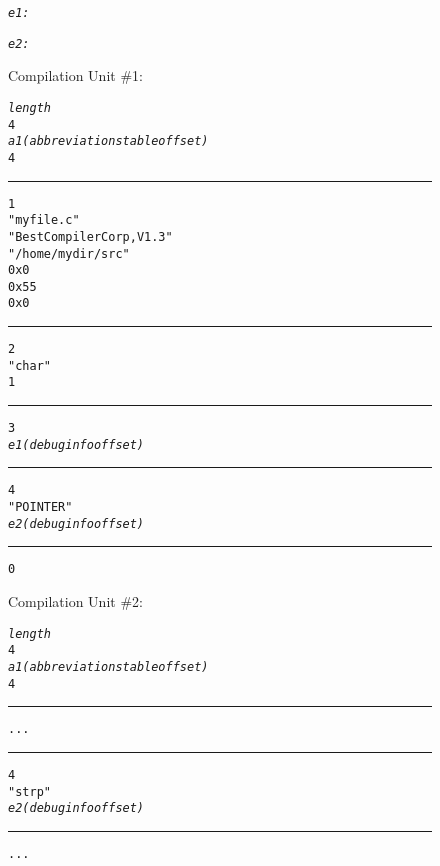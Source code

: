 \clearpage
\begin{figure}[here]
\begin{minipage}[t]{0.03\linewidth}
\flushright
\scriptsize
\begin{alltt}




















\textit{e1:}




\textit{e2:}
\end{alltt}
\end{minipage}
%
\begin{minipage}[t]{0.38\linewidth}
\centering
Compilation Unit \#1: \dotdebuginfo{}
\begin{framed}
\scriptsize
\begin{alltt}
\textit{length}
4
\textit{a1 (abbreviations table offset)}
4
\vspace{0.01cm}
\hrule
1
"myfile.c"
"Best Compiler Corp, V1.3"
"/home/mydir/src"
0x0
0x55
0x0
\vspace{0.01cm}
\hrule
2
"char"
1
\vspace{0.01cm}
\hrule
3
\textit{e1  (debug info offset)}
\vspace{0.01cm}
\hrule
4
"POINTER"
\textit{e2  (debug info offset)}
\vspace{0.01cm}
\hrule
0
\end{alltt}
%
%
\end{framed}
Compilation Unit \#2: \dotdebuginfo{}
\begin{framed}
\scriptsize
\begin{alltt}
\textit{length}
4
\textit{a1 (abbreviations table offset)}
4
\vspace{0.01cm}
\hrule
...
\vspace{0.01cm}
\hrule
4
"strp"
\textit{e2  (debug info offset)}
\vspace{0.01cm}
\hrule
...
\end{alltt}
%
%
\end{framed}
\end{minipage}
\hfill 
\begin{minipage}[t]{0.03\linewidth}
\flushright
\scriptsize
\begin{alltt}






\end{alltt}
\end{minipage}
\end{figure}
